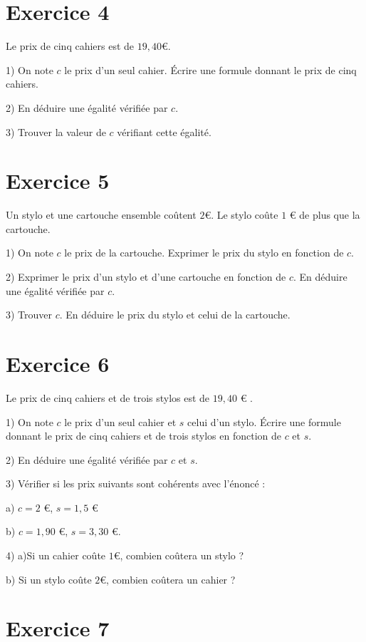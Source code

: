 \documentclass[12 pt]{article}
\theoremstyle{plain}
\newcounter{n}
\numberwithin{n}{section}
\begin{document}
\section{Exercice 4}

Le prix de cinq cahiers est de $19,40$\euro . 

1) On note $c$ le prix d'un seul cahier. Écrire une formule donnant le prix de cinq cahiers. 

2) En déduire une égalité vérifiée par $c$. 

3) Trouver la valeur de $c$ vérifiant cette égalité. 



\section{Exercice 5}

Un stylo et une cartouche ensemble coûtent $2$\euro{}. 
Le stylo coûte $1$ \euro{} de plus que la cartouche.

1) On note $c$ le prix de la cartouche. Exprimer le prix du stylo en fonction de $c$. 

2) Exprimer le prix d'un stylo et d'une cartouche en fonction de $c$. En déduire une égalité vérifiée par $c$. 

3) Trouver $c$. En déduire le prix du stylo et celui de la cartouche.  

\section{Exercice 6}

Le prix de cinq cahiers et de trois stylos est de $19,40$ \euro{} . 

1) On note $c$ le prix d'un seul cahier et $s$ celui d'un stylo. Écrire une formule donnant le prix de cinq cahiers et de trois stylos en fonction de $c$ et $s$. 

2) En déduire une égalité vérifiée par $c$ et $s$. 

3) Vérifier si les prix suivants sont cohérents avec l'énoncé : 

a) $c= 2$ \euro{}, $s= 1,5$ \euro{}

b) $c = 1,90$ \euro{}, $s= 3, 30$ \euro{}.

4) a)Si un cahier coûte $1$\euro{}, combien coûtera un stylo ? 

b) Si un stylo coûte $2$\euro{}, combien coûtera un cahier ? 
\newpage
\section{Exercice 7}
\end{document}
